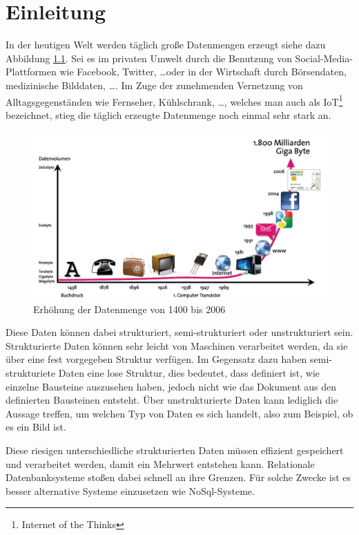 \chapter{Einleitung}
In der heutigen Welt werden täglich große Datenmengen erzeugt siehe dazu
Abbildung \ref{fig:data-grow}. Sei es im privaten Umwelt durch die Benutzung
von Social-Media-Plattformen wie Facebook, Twitter, \ldots oder in der
Wirtschaft durch Börsendaten, medizinische Bilddaten, \ldots . Im Zuge der
zunehmenden Vernetzung von Alltagsgegenständen wie Fernseher,
Kühlschrank, \ldots, welches man auch als IoT\footnote{Internet of the Thinks}
bezeichnet, stieg die täglich erzeugte Datenmenge noch einmal sehr stark an.

\begin{figure}
\centering
\includegraphics[scale=0.25]{images/bitkom-lf-bigdata-2012-data_grow.jpg}
\caption{Erhöhung der Datenmenge von 1400 bis 2006 \cite{Weber2012}}
\label{fig:data-grow}
\end{figure}

Diese Daten können dabei strukturiert, semi-strukturiert oder unstrukturiert
sein. Strukturierte Daten können sehr leicht von Maschinen verarbeitet werden,
da sie über eine fest vorgegeben Struktur verfügen. Im Gegensatz dazu haben
semi-strukturiete Daten eine lose Struktur, dies bedeutet, dass definiert ist,
wie einzelne Bausteine auszusehen haben, jedoch nicht wie das Dokument aus den
definierten Bausteinen entsteht. Über unstrukturierte Daten kann lediglich die
Aussage treffen, um welchen Typ von Daten es sich handelt, also zum Beispiel,
ob es ein Bild ist.

Diese riesigen unterschiedliche strukturierten Daten müssen effizient
gespeichert und verarbeitet werden, damit ein Mehrwert entstehen kann.
Relationale Datenbanksysteme stoßen dabei schnell an ihre Grenzen. Für solche
Zwecke ist es besser alternative Systeme einzusetzen wie NoSql-Systeme.

